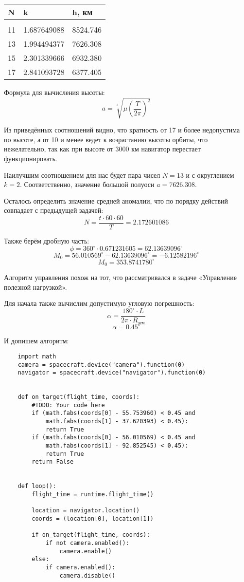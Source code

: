 \begin{tabular}{ |l |l |l |}
    N	&k	&h, км\\
    \hline\\
    11	& 1.687649088	& 8524.746\\
    \hline
    13	& 1.994494377	& 7626.308\\
    \hline
    15	& 2.301339666	& 6932.380\\
    \hline
    17	& 2.841093728	& 6377.405\\
    \hline
\end{tabular}

Формула для вычисления высоты:
$$a=\sqrt[3]{\mu\left(\frac{T}{2\pi}\right)^2}$$

Из приведённых соотношений видно, что кратность от 17 и 
более недопустима по высоте, а от 10 и менее ведет к 
возрастанию высоты орбиты, что нежелательно, так как 
при высоте от 3000 км навигатор перестает функционировать.

Наилучшим соотношением для нас будет пара чисел $N=13$ и с 
округлением $k=2$. Соответственно, значение большой полуоси 
$a=7626.308$.

Осталось определить значение средней аномалии, что по 
порядку действий совпадает с предыдущей задачей:
$$N = \frac{t \cdot 60 \cdot 60}{T} = 2.172601086$$

Также берём дробную часть:
$$\phi = 360^\circ \cdot 0.671231605 = 62.13639096^\circ$$
$$M_0 = 56.010569^\circ -  62.13639096^\circ = -6.12582196^\circ$$
$$M_0 = 353.8741780^\circ$$

Алгоритм управления похож на тот, что рассматривался в задаче 
«Управление полезной нагрузкой».

Для начала также вычислим допустимую угловую погрешность:
$$\alpha=\frac{180^\circ\cdot L}{2\pi \cdot R_\text{зем}}$$
$$\alpha = 0.45^\circ$$

И допишем алгоритм:

\begin{verbatim}
    import math
    camera = spacecraft.device("camera").function(0)
    navigator = spacecraft.device("navigator").function(0)


    def on_target(flight_time, coords):
        #TODO: Your code here
        if (math.fabs(coords[0] - 55.753960) < 0.45 and 
            math.fabs(coords[1] - 37.620393) < 0.45):
            return True
        if (math.fabs(coords[0] - 56.010569) < 0.45 and 
            math.fabs(coords[1] - 92.852545) < 0.45):
            return True
        return False


    def loop():
        flight_time = runtime.flight_time()

        location = navigator.location()
        coords = (location[0], location[1])

        if on_target(flight_time, coords):
            if not camera.enabled():
                camera.enable()
        else:
            if camera.enabled():
                camera.disable()

\end{verbatim}

